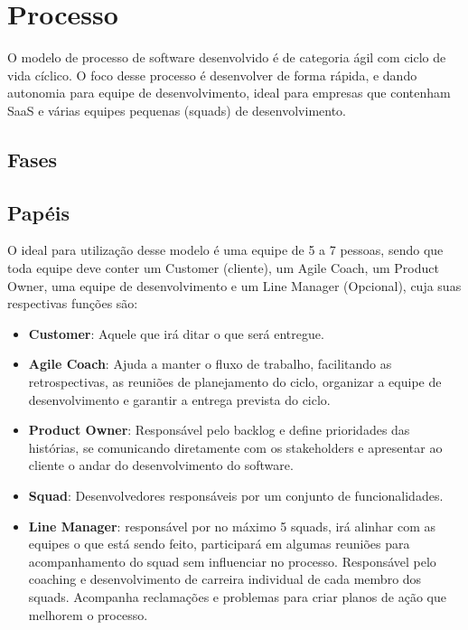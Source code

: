 \documentclass[	DIV=calc,%
							paper=a4,%
							fontsize=12pt,%
							onecolumn]{scrartcl}	 					%
\begin{document}
\section{Processo}
O modelo de processo de software desenvolvido é de categoria ágil com ciclo de vida cíclico. O foco desse processo é desenvolver de forma rápida, e dando autonomia para equipe de desenvolvimento, ideal para empresas que contenham SaaS e várias equipes pequenas (squads) de desenvolvimento.

\subsection{Fases}

\subsection{Papéis}
O ideal para utilização desse modelo é uma equipe de 5 a 7 pessoas, sendo que toda equipe deve conter um Customer (cliente), um Agile Coach, um Product Owner, uma equipe de desenvolvimento e um Line Manager (Opcional), cuja suas respectivas funções são: 
\begin{itemize}
	\item \textbf{Customer}: Aquele que irá ditar o que será entregue.
	\item \textbf{Agile Coach}: Ajuda a manter o fluxo de trabalho, facilitando as retrospectivas, as reuniões de planejamento do ciclo, organizar a equipe de desenvolvimento e garantir a entrega prevista do ciclo. 
	
	\item \textbf{Product Owner}: Responsável pelo backlog e define prioridades das histórias, se comunicando diretamente com os stakeholders e apresentar ao cliente o andar do desenvolvimento do software. 
	
	\item \textbf{Squad}: Desenvolvedores responsáveis por um conjunto de funcionalidades. 
	
	\item \textbf{Line Manager}: responsável por no máximo 5 squads, irá alinhar com as equipes o que está sendo feito, participará em algumas reuniões para acompanhamento do squad sem influenciar no processo. Responsável pelo coaching e desenvolvimento de carreira individual de cada membro dos squads. Acompanha reclamações e problemas para criar planos de ação que melhorem o processo. 
\end{itemize}
\end{document}
